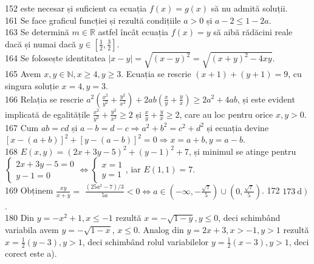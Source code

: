 \documentclass[11pt]{article}
\begin{document}
152 este necesar și suficient ca ecuația $f(x)=g(x)$ să nu admită soluții.\\
161 Se face graficul funcției și rezultă condițiile $a>0$ și $a-2 \leq 1-2 a$.\\
163 Se determină $m \in \mathbb{R}$ astfel încât ecuația $f(x)=y$ să aibă rădăcini reale dacă și numai dacă $y \in\left[\frac{1}{2}, \frac{3}{2}\right]$.\\
164 Se folosește identitatea $|x-y|=\sqrt{(x-y)^{2}}=\sqrt{(x+y)^{2}-4 x y}$.\\ 
165 Avem $x, y \in \mathbb{N}, x \geq 4, y \geq 3$. Ecuația se rescrie $(x+1)+(y+1)=9$, cu singura soluție $x=4, y=3$.\\
166 Relația se rescrie $a^{2}\left(\frac{x^{2}}{y^{2}}+\frac{y^{2}}{x^{2}}\right)+2 a b\left(\frac{x}{y}+\frac{y}{x}\right) \geq 2 a^{2}+4 a b$, și este evident implicată de egalitățile $\frac{x^{2}}{y^{2}}+\frac{y^{2}}{x^{2}} \geq 2$ și $\frac{x}{y}+\frac{y}{x} \geq 2$, care au loc pentru orice $x, y>0$.\\
167 Cum $a b=c d$ și $a-b=d-c \Rightarrow a^{2}+b^{2}=c^{2}+d^{2}$ și ecuația devine $[x-(a+b)]^{2}+[y-(a-b)]^{2}=0 \Rightarrow x=a+b, y=a-b$.\\
168 $E(x, y)=(2 x+3 y-5)^{2}+(y-1)^{2}+7$, și minimul se atinge pentru $\left\{\begin{array}{l}2 x+3 y-5=0 \\ y-1=0\end{array} \Leftrightarrow\left\{\begin{array}{l}x=1 \\ y=1\end{array}\right.\right.$, iar $E(1,1)=7$.\\
169 Obținem $\frac{x y}{x+y}=$ $\frac{\left(25 a^{2}-7\right) / 3}{5 a}<0 \Leftrightarrow a \in\left(-\infty,-\frac{\sqrt{7}}{5}\right) \cup\left(0, \frac{\sqrt{7}}{5}\right)$.
172 $\left.173 \mathrm{~d}\right)$.\\
180 Din $y=-x^{2}+1, x \leq-1$ rezultă $x=-\sqrt{1-y}, y \leq 0$, deci schimbând variabila avem $y=-\sqrt{1-x}$, $x \leq 0$. Analog din $y=2 x+3, x>-1, y>1$ rezultă $x=\frac{1}{2}(y-3), y>1$, deci schimbând rolul variabilelor $y=\frac{1}{2}(x-3), y>1$, deci corect este a).\\
\end{document}
